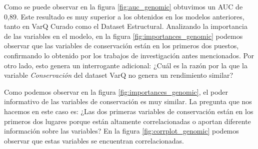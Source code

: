 Como se puede observar en la figura \ref{fig:auc_genomic} obtuvimos un AUC de 0,89. Este resultado es muy superior a los obtenidos en los modelos anteriores, tanto en VarQ Curado como el Dataset Estructural. 
Analizando la importancia de las variables en el modelo, en la figura \ref{fig:importances_genomic} podemos observar que las variables de conservación están en los primeros dos puestos, confirmando lo obtenido por los trabajos de investigación antes mencionados. Por otro lado, esto genera un interrogante adicional: ¿Cuál es la razón por la que la variable \textit{Conservación} del dataset VarQ no genera un rendimiento similar?

Como podemos observar en la figura \ref{fig:importances_genomic}, el poder informativo de las variables de conservación es muy similar. La pregunta que nos hacemos en este caso es: ¿Las dos primeras variables de conservación están en los primeros dos lugares porque están altamente correlacionadas o aportan diferente información sobre las variables? En la figura \ref{fig:corrplot_genomic} podemos observar que estas variables se encuentran correlacionadas. 

\newpage

